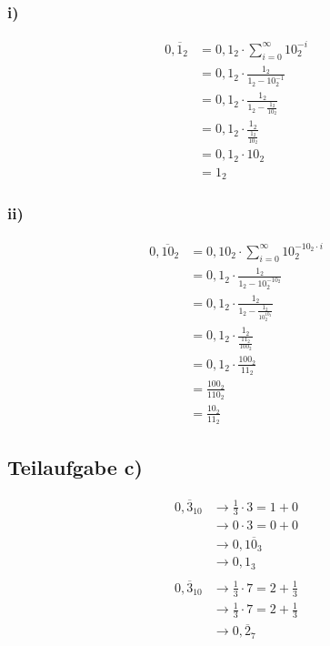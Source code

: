 \documentclass{llncs}
\begin{document}
\subsubsection*{i)}

\begin{align*}
0,\overline{1}_2 &= 0,1_2 \cdot \sum_{i=0}^{\infty} 10^{-i}_2 \\
               &= 0,1_2 \cdot \frac{1_2}{1_2-10^{-1}_2} \\
               &= 0,1_2 \cdot \frac{1_2}{1_2-\frac{1_2}{10_2}} \\
               &= 0,1_2 \cdot \frac{1_2}{\frac{1_2}{10_2}} \\
               &= 0,1_2 \cdot 10_2 \\
               &= 1_2
\end{align*}

\subsubsection*{ii)}

\begin{align*}
0,\overline{10}_2 &= 0,10_2 \cdot \sum_{i=0}^{\infty} 10^{-10_2 \cdot i}_2 \\
                  &= 0,1_2 \cdot \frac{1_2}{1_2-10^{-10_2}_2} \\
                  &= 0,1_2 \cdot \frac{1_2}{1_2-\frac{1_2}{10^{10_2}_2}} \\
                  &= 0,1_2 \cdot \frac{1_2}{\frac{11_2}{100_2}} \\
                  &= 0,1_2 \cdot \frac{100_2}{11_2} \\
                  &= \frac{100_2}{110_2} \\
                  &= \frac{10_2}{11_2}
\end{align*}


\subsection*{Teilaufgabe c)}

\begin{align*}
0,\overline{3}_{10} &\longrightarrow \frac{1}{3} \cdot 3 = 1 + 0 \\
                    &\longrightarrow 0 \cdot 3 = 0 + 0 \\
                    &\longrightarrow 0,1\overline{0}_{3} \\
                    &\longrightarrow 0,1_{3} \\
                  \\
0,\overline{3}_{10} &\longrightarrow \frac{1}{3} \cdot 7 = 2 + \frac{1}{3} \\
                    &\longrightarrow \frac{1}{3} \cdot 7 = 2 + \frac{1}{3} \\
                    &\longrightarrow 0,\overline{2}_{7}
\end{align*}
\end{document}
